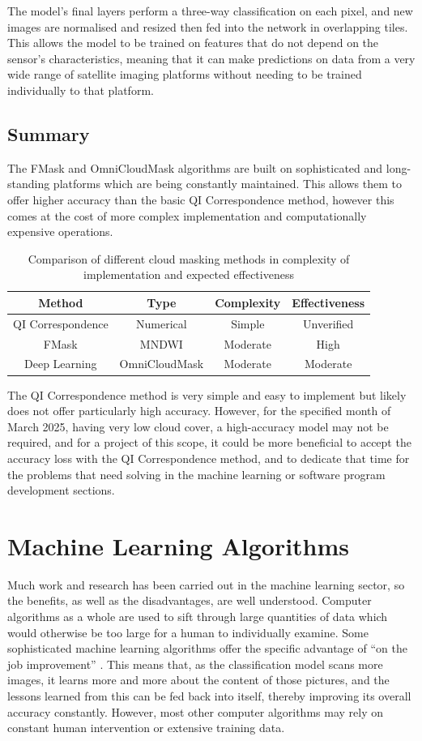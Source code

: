The model’s final layers perform a three-way classification on each pixel, and new images are normalised and resized then fed into the network in overlapping tiles. This allows the model to be trained on features that do not depend on the sensor's characteristics, meaning that it can make predictions on data from a very wide range of satellite imaging platforms without needing to be trained individually to that platform. 

\subsection{Summary}
The FMask and OmniCloudMask algorithms are built on sophisticated and long-standing platforms which are being constantly maintained. This allows them to offer higher accuracy than the basic QI Correspondence method, however this comes at the cost of more complex implementation and computationally expensive operations. 

\begin{table}[ht]
\centering
\begin{tabular}{|c|c|c|c|}
\hline
\textbf{Method} & \textbf{Type} & \textbf{Complexity} & \textbf{Effectiveness} \\
\hline
QI Correspondence & Numerical & Simple & Unverified \\
FMask & MNDWI & Moderate & High \\
Deep Learning & OmniCloudMask & Moderate & Moderate \\
\hline
\end{tabular}
\caption{Comparison of different cloud masking methods in complexity of implementation and expected effectiveness}
\label{tab:cloud masking comparisons}
\end{table}

The QI Correspondence method is very simple and easy to implement but likely does not offer particularly high accuracy. However, for the specified month of March 2025, having very low cloud cover, a high-accuracy model may not be required, and for a project of this scope, it could be more beneficial to accept the accuracy loss with the QI Correspondence method, and to dedicate that time for the problems that need solving in the machine learning or software program development sections. 

\section{Machine Learning Algorithms}
Much work and research has been carried out in the machine learning sector, so the benefits, as well as the disadvantages, are well understood. Computer algorithms as a whole are used to sift through large quantities of data which would otherwise be too large for a human to individually examine. Some sophisticated machine learning algorithms offer the specific advantage of “on the job improvement” \citep{zhang_2010_new}. This means that, as the classification model scans more images, it learns more and more about the content of those pictures, and the lessons learned from this can be fed back into itself, thereby improving its overall accuracy constantly. However, most other computer algorithms may rely on constant human intervention or extensive training data. 

